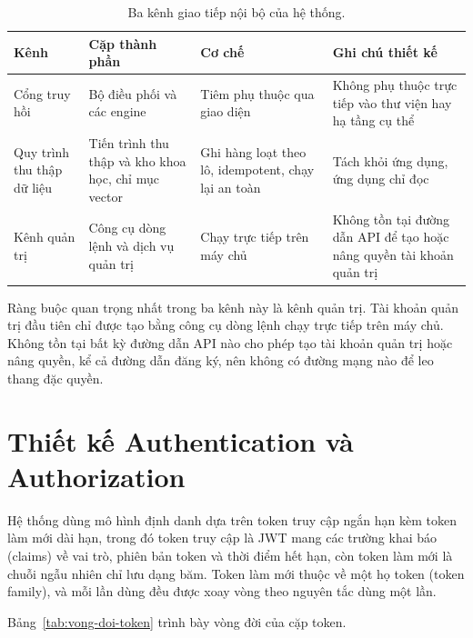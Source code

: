 \begin{table}[htbp]
    \centering
    \caption{Ba kênh giao tiếp nội bộ của hệ thống.}
    \label{tab:kenh-giao-tiep-noi-bo}
    \small
    \begin{tabularx}{\textwidth}{@{}>{\raggedright\arraybackslash}p{2.7cm}>{\raggedright\arraybackslash}p{3.4cm}>{\raggedright\arraybackslash}p{3.2cm}>{\raggedright\arraybackslash}X@{}}
        \toprule
        \textbf{Kênh} & \textbf{Cặp thành phần} & \textbf{Cơ chế} & \textbf{Ghi chú thiết kế} \\
        \midrule
        Cổng truy hồi & Bộ điều phối và các engine & Tiêm phụ thuộc qua giao diện & Không phụ thuộc trực tiếp vào thư viện hay hạ tầng cụ thể \\
        Quy trình thu thập dữ liệu & Tiến trình thu thập và kho khoa học, chỉ mục vector & Ghi hàng loạt theo lô, idempotent, chạy lại an toàn & Tách khỏi ứng dụng, ứng dụng chỉ đọc \\
        Kênh quản trị & Công cụ dòng lệnh và dịch vụ quản trị & Chạy trực tiếp trên máy chủ & Không tồn tại đường dẫn API để tạo hoặc nâng quyền tài khoản quản trị \\
        \bottomrule
    \end{tabularx}
\end{table}

Ràng buộc quan trọng nhất trong ba kênh này là kênh quản trị. Tài khoản quản trị đầu tiên chỉ được tạo bằng công cụ dòng lệnh chạy trực tiếp trên máy chủ. Không tồn tại bất kỳ đường dẫn API nào cho phép tạo tài khoản quản trị hoặc nâng quyền, kể cả đường dẫn đăng ký, nên không có đường mạng nào để leo thang đặc quyền.

\section{Thiết kế Authentication và Authorization}
\label{sec:auth}

Hệ thống dùng mô hình định danh dựa trên token truy cập ngắn hạn kèm token làm mới dài hạn, trong đó token truy cập là JWT mang các trường khai báo (claims) về vai trò, phiên bản token và thời điểm hết hạn, còn token làm mới là chuỗi ngẫu nhiên chỉ lưu dạng băm. Token làm mới thuộc về một họ token (token family), và mỗi lần dùng đều được xoay vòng theo nguyên tắc dùng một lần.

Bảng~\ref{tab:vong-doi-token} trình bày vòng đời của cặp token.

